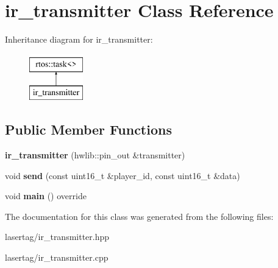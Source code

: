 \hypertarget{classir__transmitter}{}\section{ir\+\_\+transmitter Class Reference}
\label{classir__transmitter}
Inheritance diagram for ir\+\_\+transmitter\+:\begin{figure}[H]
\begin{center}
\leavevmode
\includegraphics[height=2.000000cm]{classir__transmitter}
\end{center}
\end{figure}
\subsection*{Public Member Functions}
\begin{DoxyCompactItemize}
\item 
\mbox{\label{classir__transmitter_a532f916d2330c2308558931e724a1418}} 
{\bfseries ir\+\_\+transmitter} (hwlib\+::pin\+\_\+out \&transmitter)
\item 
\mbox{\label{classir__transmitter_ae547c094efae5f733cb1d2291841450a}} 
void {\bfseries send} (const uint16\+\_\+t \&player\+\_\+id, const uint16\+\_\+t \&data)
\item 
\mbox{\label{classir__transmitter_a9dbedfe68066943a93ac4e109447e0a8}} 
void {\bfseries main} () override
\end{DoxyCompactItemize}


The documentation for this class was generated from the following files\+:\begin{DoxyCompactItemize}
\item 
lasertag/ir\+\_\+transmitter.\+hpp\item 
lasertag/ir\+\_\+transmitter.\+cpp\end{DoxyCompactItemize}
